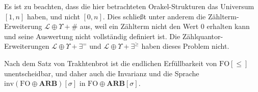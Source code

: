 Es ist zu beachten, dass die hier betrachteten Orakel-Strukturen das
Universum $\left[1,n\right]$ haben, und nicht $\left[0,n\right]$.
Dies schließt unter anderem die Zählterm-Erweiterung $\mathcal{L}\oplus\Upsilon+\#$
aus, weil ein Zählterm nicht den Wert $0$ erhalten kann und seine
Auswertung nicht vollständig definiert ist. Die Zählquantor-Erweiterungen
$\mathcal{L}\oplus\Upsilon+\exists^{=}$ und $\mathcal{L}\oplus\Upsilon+\exists^{\geqslant}$
haben dieses Problem nicht.

Nach dem Satz von Trakhtenbrot ist die endlichen Erfüllbarkeit von
$\mathrm{FO}\left[\leqslant\right]$ unentscheidbar, und daher auch
die Invarianz und die Sprache $\mbox{inv}\left(\mathrm{FO}\oplus\mathbf{ARB}\right)\left[\sigma\right]$
in $\mathrm{FO}\oplus\mathbf{ARB}\left[\sigma\right]$.\cite{EbbinghausFlumThomas,Libkin2012,Schweikardt13ashort} 
